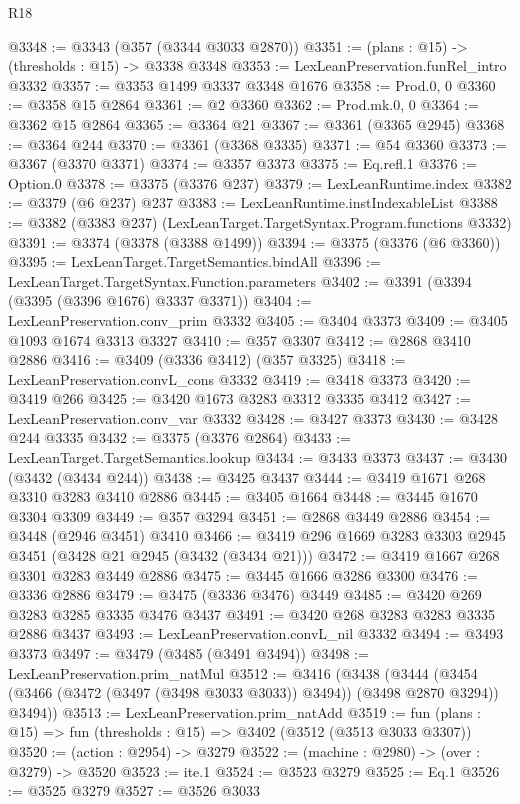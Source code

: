 \begin{lexlean}{R18}
\begin{coremodule}
{{{{{{{{{{{{{{{{{{{{{{{{{{{{{{{{{{{{{{{{{{{{{{{{{{{{{{{{{{{{{{{{{{{{{{{{{{{{{{{{{{{{{{{{{{{{{{{{{{{{{{{{{{{{{{{{{{{{{{{{{{{{{{{{{{{{{{{{{{{{{{{@3348 := @3343 (@357 (@3344 @3033 @2870))
@3351 := (plans : @15) -> (thresholds : @15) -> @3338 @3348
@3353 := LexLeanPreservation.funRel_intro @3332
@3357 := @3353 @1499 @3337 @3348 @1676
@3358 := Prod.{0, 0}
@3360 := @3358 @15 @2864
@3361 := @2 @3360
@3362 := Prod.mk.{0, 0}
@3364 := @3362 @15 @2864
@3365 := @3364 @21
@3367 := @3361 (@3365 @2945)
@3368 := @3364 @244
@3370 := @3361 (@3368 @3335)
@3371 := @54 @3360
@3373 := @3367 (@3370 @3371)
@3374 := @3357 @3373
@3375 := Eq.refl.{1}
@3376 := Option.{0}
@3378 := @3375 (@3376 @237)
@3379 := LexLeanRuntime.index
@3382 := @3379 (@6 @237) @237
@3383 := LexLeanRuntime.instIndexableList
@3388 := @3382 (@3383 @237) (LexLeanTarget.TargetSyntax.Program.functions @3332)
@3391 := @3374 (@3378 (@3388 @1499))
@3394 := @3375 (@3376 (@6 @3360))
@3395 := LexLeanTarget.TargetSemantics.bindAll
@3396 := LexLeanTarget.TargetSyntax.Function.parameters
@3402 := @3391 (@3394 (@3395 (@3396 @1676) @3337 @3371))
@3404 := LexLeanPreservation.conv_prim @3332
@3405 := @3404 @3373
@3409 := @3405 @1093 @1674 @3313 @3327
@3410 := @357 @3307
@3412 := @2868 @3410 @2886
@3416 := @3409 (@3336 @3412) (@357 @3325)
@3418 := LexLeanPreservation.convL_cons @3332
@3419 := @3418 @3373
@3420 := @3419 @266
@3425 := @3420 @1673 @3283 @3312 @3335 @3412
@3427 := LexLeanPreservation.conv_var @3332
@3428 := @3427 @3373
@3430 := @3428 @244 @3335
@3432 := @3375 (@3376 @2864)
@3433 := LexLeanTarget.TargetSemantics.lookup
@3434 := @3433 @3373
@3437 := @3430 (@3432 (@3434 @244))
@3438 := @3425 @3437
@3444 := @3419 @1671 @268 @3310 @3283 @3410 @2886
@3445 := @3405 @1664
@3448 := @3445 @1670 @3304 @3309
@3449 := @357 @3294
@3451 := @2868 @3449 @2886
@3454 := @3448 (@2946 @3451) @3410
@3466 := @3419 @296 @1669 @3283 @3303 @2945 @3451 (@3428 @21 @2945 (@3432 (@3434 @21)))
@3472 := @3419 @1667 @268 @3301 @3283 @3449 @2886
@3475 := @3445 @1666 @3286 @3300
@3476 := @3336 @2886
@3479 := @3475 (@3336 @3476) @3449
@3485 := @3420 @269 @3283 @3285 @3335 @3476 @3437
@3491 := @3420 @268 @3283 @3283 @3335 @2886 @3437
@3493 := LexLeanPreservation.convL_nil @3332
@3494 := @3493 @3373
@3497 := @3479 (@3485 (@3491 @3494))
@3498 := LexLeanPreservation.prim_natMul
@3512 := @3416
    (@3438
      (@3444 (@3454 (@3466 (@3472 (@3497 (@3498 @3033 @3033)) @3494)) (@3498 @2870 @3294)) @3494))
@3513 := LexLeanPreservation.prim_natAdd
@3519 := fun (plans : @15) => fun (thresholds : @15) => @3402 (@3512 (@3513 @3033 @3307))
@3520 := (action : @2954) -> @3279
@3522 := (machine : @2980) -> (over : @3279) -> @3520
@3523 := ite.{1}
@3524 := @3523 @3279
@3525 := Eq.{1}
@3526 := @3525 @3279
@3527 := @3526 @3033
}}}}}}}}}}}}}}}}}}}}}}}}}}}}}}}}}}}}}}}}}}}}}}}}}}}}}}}}}}}}}}}}}}}}}}}}}}}}}}}}}}}}}}}}}}}}}}}}}}}}}}}}}}}}}}}}}}}}}}}}}}}}}}}}}}}}}}}}}}}}}}}
\end{coremodule}
\end{lexlean}
